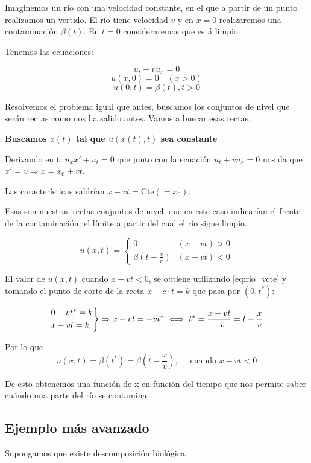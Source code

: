 \documentclass[palatino]{apuntes}
\begin{document}
Imaginemos un río con una velocidad constante, en el que a partir de un punto realizamos un vertido. El río tiene velocidad $v$ y en $x=0$ realizaremos una contaminación $\beta(t)$. En $t=0$ consideraremos que está limpio.

Tenemos las ecuaciones:

$$u_t + vu_x = 0$$
$$u(x,0) = 0 \quad (x>0) $$
$$u(0,t) = \beta(t), t>0$$


Resolvemos el problema igual que antes, buscamos los conjuntos de nivel que serán rectas como nos ha salido antes. Vamos a buscar esas rectas.

\textbf{Buscamos $x(t)$ tal que $u(x(t),t)$ sea constante}

Derivando en t: $u_x x' + u_t = 0$ que junto con la ecuación $u_t + v u_x = 0$ nos da que $x' = v \Rightarrow x = x_0 + vt $.

Las características saldrían \(x-vt = \text{Cte}(=x_0) \label{eq:rio_vcte}\).

Esas son nuestras rectas conjuntos de nivel, que en este caso indicarían el frente de la contaminación, el límite a partir del cual el río sigue limpio.

$$u(x,t) =
	\begin{cases}
		0                      & (x-vt) > 0 \\
		\beta(t - \frac{x}{v}) & (x-vt) < 0
	\end{cases}
$$

El valor de $u(x,t)$ cuando $x-vt < 0$, se obtiene utilizando \ref{eq:rio_vcte} y tomando el punto de corte de la recta $x-c \cdot t=k$ que pasa por $(0,t^*)$:

$$
\begin{rcases}
	0 - vt^{*} = k \\
	x - vt = k
\end{rcases}
 \Rightarrow x-vt = -vt^{*} \iff t^* = \frac{x-vt}{-v} = t - \frac{x}{v}$$

Por lo que
$$u(x,t) = \beta(t^*) = \beta(t - \frac{x}{v}), \quad \text{ cuando } x - vt < 0$$

De esto obtenemos una función de x en función del tiempo que nos permite saber cuándo una parte del río se contamina.

\subsection{Ejemplo más avanzado}

Supongamos que existe descomposición biológica:
\end{document}
